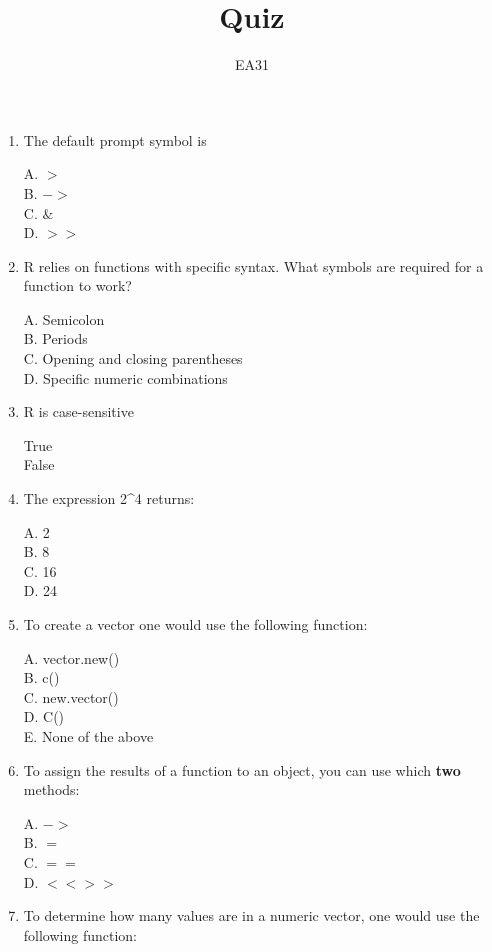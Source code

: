 \documentclass[12pt]{article}\usepackage[]{graphicx}\usepackage[]{color}
\title{Quiz}
\author{EA31}
\begin{document}
\maketitle

\begin{enumerate}

\item The default prompt symbol is 

A. $>$\\
B. $->$ \\
C. $\&$ \\
D. $>>$ 

\item R relies on functions with specific syntax. What symbols are required for a function to work?

A. Semicolon \\
B. Periods \\ 
C. Opening and closing parentheses \\
D. Specific numeric combinations \\

\item R is case-sensitive

True \\
False \\

\item The expression 2\^{}4 returns:

A. 2 \\
B. 8 \\
C. 16 \\
D. 24 \\

\item To create a vector one would use the following function:

A. vector.new() \\
B. c() \\
C. new.vector() \\
D. C() \\
E. None of the above 

\item To assign the results of a function to an object, you can use which \textbf{two} methods:

A. $->$ \\
B. $=$ \\
C. $==$ \\
D. $<<>>$ \\

\item To determine how many values are in a numeric vector, one would use the following function: 


\end{enumerate}
\end{document}
